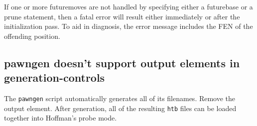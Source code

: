 \documentclass[11pt]{article}
\begin{document}
If one or more futuremoves are not handled by specifying either a
futurebase or a prune statement, then a fatal error will result either
immediately or after the initialization pass.  To aid in diagnosis,
the error message includes the FEN of the offending position.

\subsection{pawngen doesn't support output elements in generation-controls}

The {\tt pawngen} script automatically generates all of its filenames.
Remove the output element.  After generation, all of the resulting
{\tt htb} files can be loaded together into Hoffman's probe mode.
\end{document}
